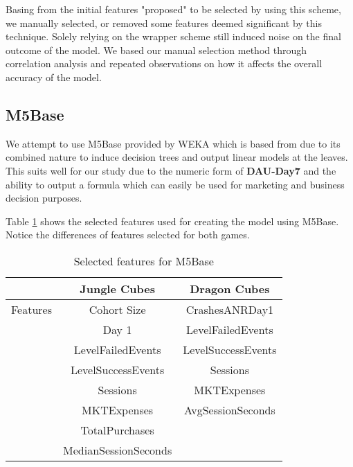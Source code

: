 Basing from the initial features "proposed" to be selected by using this scheme, we manually selected, or removed some features deemed significant by this technique. Solely relying on the wrapper scheme still induced noise on the final outcome of the model. We based our manual selection method through correlation analysis and repeated observations on how it affects the overall accuracy of the model.

\subsection{M5Base}
We attempt to use M5Base provided by WEKA which is based from \cite{ref:m5base} due to its combined nature to induce decision trees and output linear models at the leaves. This suits well for our study due to the numeric form of \textbf{DAU-Day7} and the ability to output a formula which can easily be used for marketing and business decision purposes.

Table \ref{table:m5base_features} shows the selected features used for creating the model using M5Base. Notice the differences of features selected for both games.
\begin{table}[h]
\centering
\caption{Selected features for M5Base}
\label{table:m5base_features}
\begin{tabular}{|c|c|c|}
\hline 
 & Jungle Cubes & Dragon Cubes\\ 
\hline 
Features & Cohort Size & CrashesANRDay1 
\\& Day 1 & LevelFailedEvents 
\\& LevelFailedEvents & LevelSuccessEvents
\\& LevelSuccessEvents & Sessions
\\& Sessions & MKTExpenses 
\\& MKTExpenses & AvgSessionSeconds 
\\& TotalPurchases & 
\\& MedianSessionSeconds &\\ 
\hline 

\end{tabular}
\end{table} 

